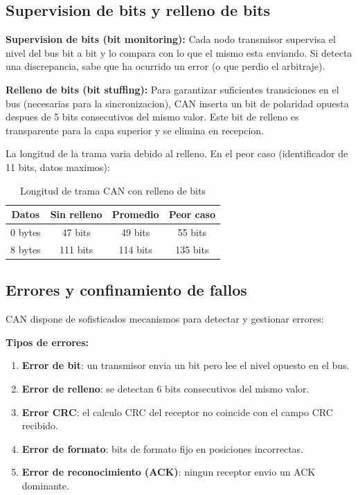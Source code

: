 \subsection{Supervision de bits y relleno de bits}

\textbf{Supervision de bits (bit monitoring):}
Cada nodo transmisor supervisa el nivel del bus bit a bit y lo compara con lo
que el mismo esta enviando. Si detecta una discrepancia, sabe que ha ocurrido
un error (o que perdio el arbitraje).

\textbf{Relleno de bits (bit stuffing):}
Para garantizar suficientes transiciones en el bus (necesarias para la
sincronizacion), CAN inserta un bit de polaridad opuesta despues de 5 bits
consecutivos del mismo valor. Este bit de relleno es transparente para la capa
superior y se elimina en recepcion.

La longitud de la trama varia debido al relleno. En el peor caso (identificador
de 11 bits, datos maximos):

\begin{table}[H]
    \centering
    \caption{Longitud de trama CAN con relleno de bits}
    \label{tab:can_longitud}
    \begin{tabular}{|c|c|c|c|}
        \hline
        \textbf{Datos} & \textbf{Sin relleno} & \textbf{Promedio} & \textbf{Peor caso} \\
        \hline
        0 bytes & 47 bits & 49 bits & 55 bits \\
        \hline
        8 bytes & 111 bits & 114 bits & 135 bits \\
        \hline
    \end{tabular}
\end{table}

\subsection{Errores y confinamiento de fallos}

CAN dispone de sofisticados mecanismos para detectar y gestionar errores:

\textbf{Tipos de errores:}
\begin{enumerate}
    \item \textbf{Error de bit}: un transmisor envia un bit pero lee el nivel
    opuesto en el bus.
    \item \textbf{Error de relleno}: se detectan 6 bits consecutivos del mismo
    valor.
    \item \textbf{Error CRC}: el calculo CRC del receptor no coincide con el
    campo CRC recibido.
    \item \textbf{Error de formato}: bits de formato fijo en posiciones incorrectas.
    \item \textbf{Error de reconocimiento (ACK)}: ningun receptor envio un ACK
    dominante.
\end{enumerate}

